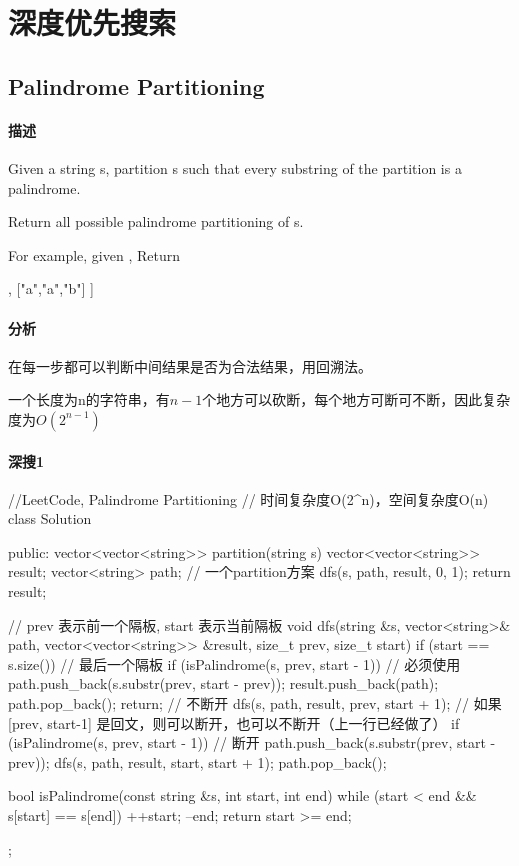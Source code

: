 \chapter{深度优先搜索}


\section{Palindrome Partitioning} %

\label{sec:palindrome-partitioning}%

\subsubsection{描述}
Given a string s, partition s such that every substring of the partition is a palindrome.

Return all possible palindrome partitioning of s.

For example, given ,
Return
\begin{Code}
  [
    ["aa","b"],
    ["a","a","b"]
  ]
\end{Code}


\subsubsection{分析}
在每一步都可以判断中间结果是否为合法结果，用回溯法。

一个长度为n的字符串，有$n-1$个地方可以砍断，每个地方可断可不断，因此复杂度为$O(2^{n-1})$


\subsubsection{深搜1}
\begin{Code}
//LeetCode, Palindrome Partitioning
// 时间复杂度O(2^n)，空间复杂度O(n)
class Solution {
public:
    vector<vector<string>> partition(string s) {
        vector<vector<string>> result;
        vector<string> path;  // 一个partition方案
        dfs(s, path, result, 0, 1);
        return result;
    }

    // prev 表示前一个隔板, start 表示当前隔板
    void dfs(string &s, vector<string>& path,
            vector<vector<string>> &result, size_t prev, size_t start) {
        if (start == s.size()) { // 最后一个隔板
            if (isPalindrome(s, prev, start - 1)) { // 必须使用
                path.push_back(s.substr(prev, start - prev));
                result.push_back(path);
                path.pop_back();
            }
            return;
        }
        // 不断开
        dfs(s, path, result, prev, start + 1);
        // 如果[prev, start-1] 是回文，则可以断开，也可以不断开（上一行已经做了）
        if (isPalindrome(s, prev, start - 1)) {
            // 断开
            path.push_back(s.substr(prev, start - prev));
            dfs(s, path, result, start, start + 1);
            path.pop_back();
        }
    }

    bool isPalindrome(const string &s, int start, int end) {
        while (start < end && s[start] == s[end]) {
            ++start;
            --end;
        }
        return start >= end;
    }
};
\end{Code}

